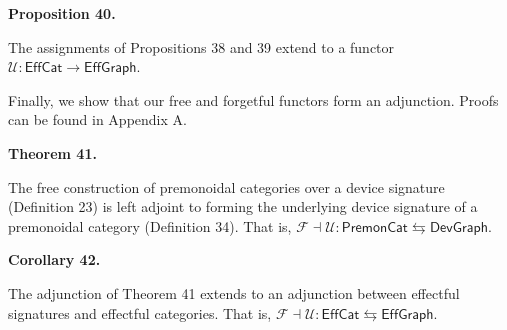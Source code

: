 \documentclass[10pt,a4paper]{article}
\begin{document}
 
 
 
\par\medskip\noindent\textbf{Proposition 40.}\par
 
 
The assignments of Propositions 38 and 39 extend to a functor $\mathscr{U}:\mathsf{EffCat}\to\mathsf{EffGraph}.$\par
 
 
 
 
Finally, we show that our free and forgetful functors form an adjunction. Proofs can be found in Appendix A.\par
 
 
 
\par\medskip\noindent\textbf{Theorem 41.}\par
 
 
The free construction of premonoidal categories over a device signature (Definition 23) is left adjoint to forming the underlying device signature of a premonoidal category (Definition 34). That is, $\mathcal{F}\dashv\mathcal{U}:\mathsf{PremonCat}\leftrightarrows\mathsf{DevGraph}.$\par
 
 
 
 
\par\medskip\noindent\textbf{Corollary 42.}\par
 
 
The adjunction of Theorem 41 extends to an adjunction between effectful signatures and effectful categories. That is, $\mathscr{F}\dashv\mathscr{U}:\mathsf{EffCat}\leftrightarrows\mathsf{EffGraph}.$\par
 
 
 
 
\end{document}

